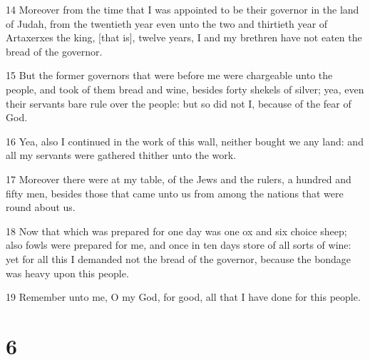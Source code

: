 \par 14 Moreover from the time that I was appointed to be their governor in the land of Judah, from the twentieth year even unto the two and thirtieth year of Artaxerxes the king, [that is], twelve years, I and my brethren have not eaten the bread of the governor.
\par 15 But the former governors that were before me were chargeable unto the people, and took of them bread and wine, besides forty shekels of silver; yea, even their servants bare rule over the people: but so did not I, because of the fear of God.
\par 16 Yea, also I continued in the work of this wall, neither bought we any land: and all my servants were gathered thither unto the work.
\par 17 Moreover there were at my table, of the Jews and the rulers, a hundred and fifty men, besides those that came unto us from among the nations that were round about us.
\par 18 Now that which was prepared for one day was one ox and six choice sheep; also fowls were prepared for me, and once in ten days store of all sorts of wine: yet for all this I demanded not the bread of the governor, because the bondage was heavy upon this people.
\par 19 Remember unto me, O my God, for good, all that I have done for this people.

\chapter{6}

